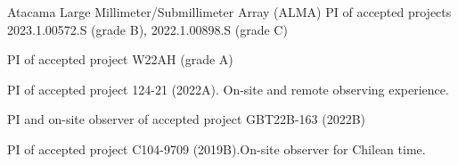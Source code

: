 \vspace{10pt}

\begin{cvskills}
	
	\cvskill
	{Atacama Large Millimeter/Submillimeter Array (ALMA)} %
	{PI of accepted projects 2023.1.00572.S (grade B), 2022.1.00898.S (grade C)} %
	
{PI of accepted project W22AH (grade A)}

{PI of accepted project 124-21 (2022A).  On-site and remote observing \newline experience.}

{PI and on-site observer of accepted project GBT22B-163 (2022B)}

{PI of accepted project C104-9709 (2019B).On-site observer for Chilean \newline time. }

\end{cvskills}


%	
%
%	
%
%
%

%
%	
%	
%
%	
%	
